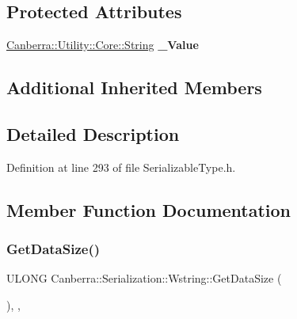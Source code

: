 \subsection*{Protected Attributes}
\begin{DoxyCompactItemize}
\item 
\mbox{\label{class_canberra_1_1_serialization_1_1_wstring_a94e16911ccf5949039efc55dd0562366}} 
\hyperlink{class_canberra_1_1_utility_1_1_core_1_1_string}{Canberra\+::\+Utility\+::\+Core\+::\+String} {\bfseries \+\_\+\+Value}
\end{DoxyCompactItemize}
\subsection*{Additional Inherited Members}


\subsection{Detailed Description}


Definition at line 293 of file Serializable\+Type.\+h.



\subsection{Member Function Documentation}
\mbox{\label{class_canberra_1_1_serialization_1_1_wstring_a6265a900bd12dedee77bbe7314423079_a6265a900bd12dedee77bbe7314423079}} 
\subsubsection{\texorpdfstring{Get\+Data\+Size()}{GetDataSize()}}
{\footnotesize\ttfamily U\+L\+O\+NG Canberra\+::\+Serialization\+::\+Wstring\+::\+Get\+Data\+Size (\begin{DoxyParamCaption}{ }\end{DoxyParamCaption})\hspace{0.3cm}{\ttfamily [inline]}, {\ttfamily [protected]}, {\ttfamily [virtual]}}

